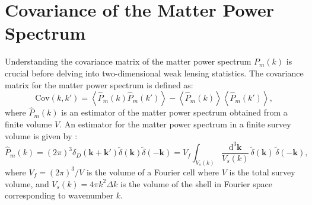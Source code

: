 \section{Covariance of the Matter Power Spectrum}
Understanding the covariance matrix of the matter power spectrum \( P_m(k) \) is crucial before delving into two-dimensional weak lensing statistics. 
The covariance matrix for the matter power spectrum is defined as:
\begin{equation}
    \mathrm{Cov}(k, k') = \left\langle \hat{P}_m(k) \hat{P}_m(k') \right\rangle - \left\langle \hat{P}_m(k) \right\rangle \left\langle \hat{P}_m(k') \right\rangle,
\end{equation}
where \( \hat{P}_m(k) \) is an estimator of the matter power spectrum obtained from a finite volume \( V \).
An estimator for the matter power spectrum in a finite survey volume is given by \citep{1994ApJ...426...23F}:
\begin{equation}
    \hat{P}_m(k) = (2\pi)^3 \delta_D(\mathbf{k} + \mathbf{k'}) \tilde{\delta}(\mathbf{k}) \tilde{\delta}(-\mathbf{k}) = V_f \int_{V_s(k)} \frac{\mathrm{d}^3 \mathbf{k}}{V_s(k)} \, \tilde{\delta}(\mathbf{k}) \, \tilde{\delta}(-\mathbf{k}),
\end{equation}
where $V_f = (2\pi)^3 / V$ is the volume of a Fourier cell where $V$ is the total survey volume, and $V_s(k) = 4\pi k^2 \Delta k$ is the volume of the shell in Fourier space corresponding to wavenumber \( k \).

